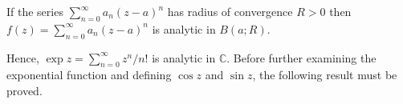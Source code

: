 If the series $\sum_{n=0}^{\infty} a_n(z-a)^n$ has radius of convergence $R > 0$ then $f(z) = \sum_{n=0}^{\infty} a_n(z-a)^n$ is analytic in $B(a; R)$.

Hence, $\exp z = \sum_{n=0}^{\infty} z^n/n!$ is analytic in $\mathbb{C}$. Before further examining the exponential function and defining $\cos z$ and $\sin z$, the following result must be proved.